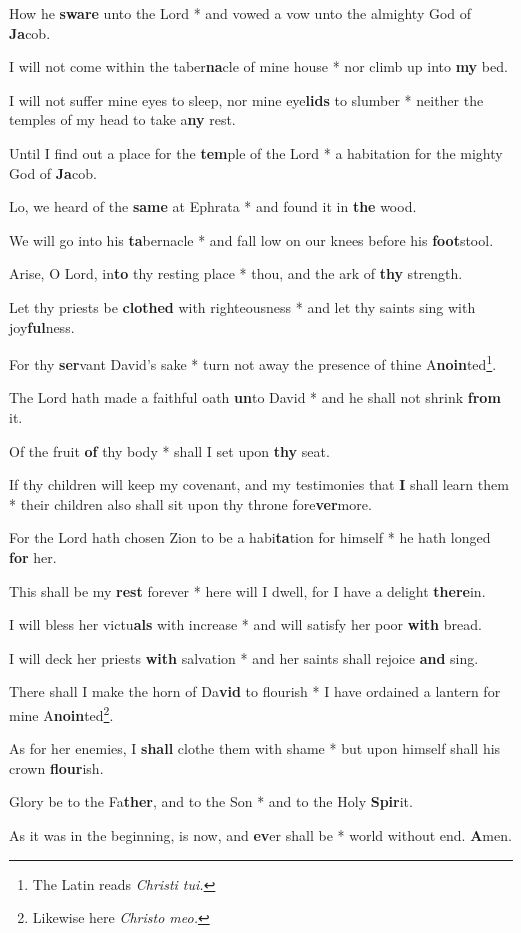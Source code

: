 \begin{multicols}{2}
	How he \textbf{sware} unto the Lord * and vowed a vow unto the almighty God of \textbf{Ja}cob.
	
	I will not come within the taber\textbf{na}cle of mine house * nor climb up into \textbf{my} bed.
	
	I will not suffer mine eyes to sleep, nor mine eye\textbf{lids} to slumber * neither the temples of my head to take a\textbf{ny} rest.
	
	Until I find out a place for the \textbf{tem}ple of the Lord * a habitation for the mighty God of \textbf{Ja}cob.
	
	Lo, we heard of the \textbf{same} at Ephrata * and found it in \textbf{the} wood.
	
	We will go into his \textbf{ta}bernacle * and fall low on our knees before his \textbf{foot}stool.
	
	Arise, O Lord, in\textbf{to} thy resting place * thou, and the ark of \textbf{thy} strength.
	
	Let thy priests be \textbf{clothed} with righteousness * and let thy saints sing with joy\textbf{ful}ness.
	
	For thy \textbf{ser}vant David's sake * turn not away the presence of thine A\textbf{noin}ted\footnote{The Latin reads \textit{Christi tui.}}.
	
	The Lord hath made a faithful oath \textbf{un}to David * and he shall not shrink \textbf{from} it.
	
	Of the fruit \textbf{of} thy body * shall I set upon \textbf{thy} seat.
	
	If thy children will keep my covenant, and my testimonies that \textbf{I} shall learn them * their children also shall sit upon thy throne fore\textbf{ver}more.
	
	For the Lord hath chosen Zion to be a habi\textbf{ta}tion for himself * he hath longed \textbf{for} her.
	
	This shall be my \textbf{rest} forever * here will I dwell, for I have a delight \textbf{there}in.
	
	I will bless her victu\textbf{als} with increase * and will satisfy her poor \textbf{with} bread.
	
	I will deck her priests \textbf{with} salvation * and her saints shall rejoice \textbf{and} sing.
	
	There shall I make the horn of Da\textbf{vid} to flourish * I have ordained a lantern for mine A\textbf{noin}ted\footnote{Likewise here \textit{Christo meo.}}.
	
	As for her enemies, I \textbf{shall} clothe them with shame * but upon himself shall his crown \textbf{flour}ish.
	
	Glory be to the Fa\textbf{ther}, and to the Son * and to the Holy \textbf{Spir}it.
	
	As it was in the beginning, is now, and \textbf{ev}er shall be * world without end. \textbf{A}men.
\end{multicols}